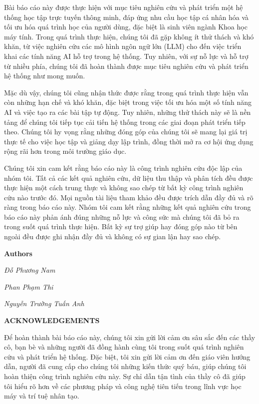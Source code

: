 \documentclass[12pt,a4paper]{report}
\theoremstyle{definition}
\begin{document}
\par Bài báo cáo này được thực hiện với mục tiêu nghiên cứu và phát triển một hệ thống học tập trực tuyến thông minh, đáp ứng nhu cầu học tập cá nhân hóa và tối ưu hóa quá trình học của người dùng, đặc biệt là sinh viên ngành Khoa học máy tính. Trong quá trình thực hiện, chúng tôi đã gặp không ít thử thách và khó khăn, từ việc nghiên cứu các mô hình ngôn ngữ lớn (LLM) cho đến việc triển khai các tính năng AI hỗ trợ trong hệ thống. Tuy nhiên, với sự nỗ lực và hỗ trợ từ nhiều phía, chúng tôi đã hoàn thành được mục tiêu nghiên cứu và phát triển hệ thống như mong muốn.
\par Mặc dù vậy, chúng tôi cũng nhận thức được rằng trong quá trình thực hiện vẫn còn những hạn chế và khó khăn, đặc biệt trong việc tối ưu hóa một số tính năng AI và việc tạo ra các bài tập tự động. Tuy nhiên, những thử thách này sẽ là nền tảng để chúng tôi tiếp tục cải tiến hệ thống trong các giai đoạn phát triển tiếp theo. Chúng tôi hy vọng rằng những đóng góp của chúng tôi sẽ mang lại giá trị thực tế cho việc học tập và giảng dạy lập trình, đồng thời mở ra cơ hội ứng dụng rộng rãi hơn trong môi trường giáo dục.
\par Chúng tôi xin cam kết rằng báo cáo này là công trình nghiên cứu độc lập của nhóm tôi. Tất cả các kết quả nghiên cứu, dữ liệu thu thập và phân tích đều được thực hiện một cách trung thực và không sao chép từ bất kỳ công trình nghiên cứu nào trước đó. Mọi nguồn tài liệu tham khảo đều được trích dẫn đầy đủ và rõ ràng trong báo cáo này. Nhóm tôi cam kết rằng những kết quả nghiên cứu trong báo cáo này phản ánh đúng những nỗ lực và công sức mà chúng tôi đã bỏ ra trong suốt quá trình thực hiện. Bất kỳ sự trợ giúp hay đóng góp nào từ bên ngoài đều được ghi nhận đầy đủ và không có sự gian lận hay sao chép.

\par\hfill\textbf{Authors}\hspace{1cm}
\par\hfill\textit{Đỗ Phương Nam}
\par\hfill\textit{Phan Phạm Thi}\hspace{0.3cm}
\par\hfill\textit{Nguyễn Trường Tuấn Anh}\hspace{0.2cm}
\newpage

\begin{center}
    \textbf{\Large ACKNOWLEDGEMENTS}
\end{center}

\par Để hoàn thành bài báo cáo này, chúng tôi xin gửi lời cảm ơn sâu sắc đến các thầy cô, bạn bè và những người đã đồng hành cùng tôi trong suốt quá trình nghiên cứu và phát triển hệ thống. Đặc biệt, tôi xin gửi lời cảm ơn đến giáo viên hướng dẫn, người đã cung cấp cho chúng tôi những kiến thức quý báu, giúp chúng tôi hoàn thiện công trình nghiên cứu này. Sự chỉ dẫn tận tình của thầy cô đã giúp tôi hiểu rõ hơn về các phương pháp và công nghệ tiên tiến trong lĩnh vực học máy và trí tuệ nhân tạo.
\end{document}

